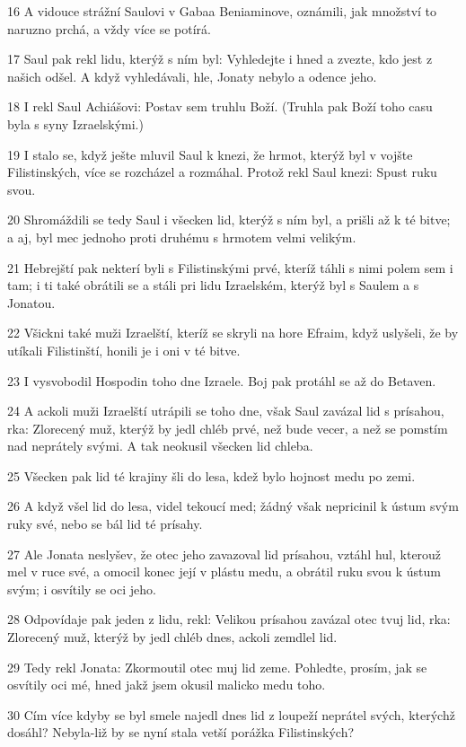 \par 16 A vidouce strážní Saulovi v Gabaa Beniaminove, oznámili, jak množství to naruzno prchá, a vždy více se potírá.
\par 17 Saul pak rekl lidu, kterýž s ním byl: Vyhledejte i hned a zvezte, kdo jest z našich odšel. A když vyhledávali, hle, Jonaty nebylo a odence jeho.
\par 18 I rekl Saul Achiášovi: Postav sem truhlu Boží. (Truhla pak Boží toho casu byla s syny Izraelskými.)
\par 19 I stalo se, když ješte mluvil Saul k knezi, že hrmot, kterýž byl v vojšte Filistinských, více se rozcházel a rozmáhal. Protož rekl Saul knezi: Spust ruku svou.
\par 20 Shromáždili se tedy Saul i všecken lid, kterýž s ním byl, a prišli až k té bitve; a aj, byl mec jednoho proti druhému s hrmotem velmi velikým.
\par 21 Hebrejští pak nekterí byli s Filistinskými prvé, kteríž táhli s nimi polem sem i tam; i ti také obrátili se a stáli pri lidu Izraelském, kterýž byl s Saulem a s Jonatou.
\par 22 Všickni také muži Izraelští, kteríž se skryli na hore Efraim, když uslyšeli, že by utíkali Filistinští, honili je i oni v té bitve.
\par 23 I vysvobodil Hospodin toho dne Izraele. Boj pak protáhl se až do Betaven.
\par 24 A ackoli muži Izraelští utrápili se toho dne, však Saul zavázal lid s prísahou, rka: Zlorecený muž, kterýž by jedl chléb prvé, než bude vecer, a než se pomstím nad neprátely svými. A tak neokusil všecken lid chleba.
\par 25 Všecken pak lid té krajiny šli do lesa, kdež bylo hojnost medu po zemi.
\par 26 A když všel lid do lesa, videl tekoucí med; žádný však nepricinil k ústum svým ruky své, nebo se bál lid té prísahy.
\par 27 Ale Jonata neslyšev, že otec jeho zavazoval lid prísahou, vztáhl hul, kterouž mel v ruce své, a omocil konec její v plástu medu, a obrátil ruku svou k ústum svým; i osvítily se oci jeho.
\par 28 Odpovídaje pak jeden z lidu, rekl: Velikou prísahou zavázal otec tvuj lid, rka: Zlorecený muž, kterýž by jedl chléb dnes, ackoli zemdlel lid.
\par 29 Tedy rekl Jonata: Zkormoutil otec muj lid zeme. Pohledte, prosím, jak se osvítily oci mé, hned jakž jsem okusil malicko medu toho.
\par 30 Cím více kdyby se byl smele najedl dnes lid z loupeží neprátel svých, kterýchž dosáhl? Nebyla-liž by se nyní stala vetší porážka Filistinských?

